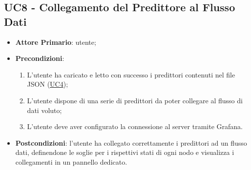 	
	\label{par:UC8}
	\subsection{UC8 - Collegamento del Predittore al Flusso Dati}
		\begin{itemize}
			\item\textbf{Attore Primario}: utente;
			\item\textbf{Precondizioni}: 
				\begin{enumerate}
					\item L’utente ha caricato e letto con successo i predittori contenuti nel file JSON (\hyperref[par:UC4]{UC4});
					\item L’utente dispone di una serie di predittori da poter collegare al flusso di dati voluto;
					\item L’utente deve aver configurato la connessione al server tramite Grafana.	
				\end{enumerate}
			\item\textbf{Postcondizioni}: l’utente ha collegato correttamente i predittori ad un flusso dati, definendone le soglie per i rispettivi stati di ogni nodo e visualizza i collegamenti in un pannello dedicato. 


\end{itemize}
